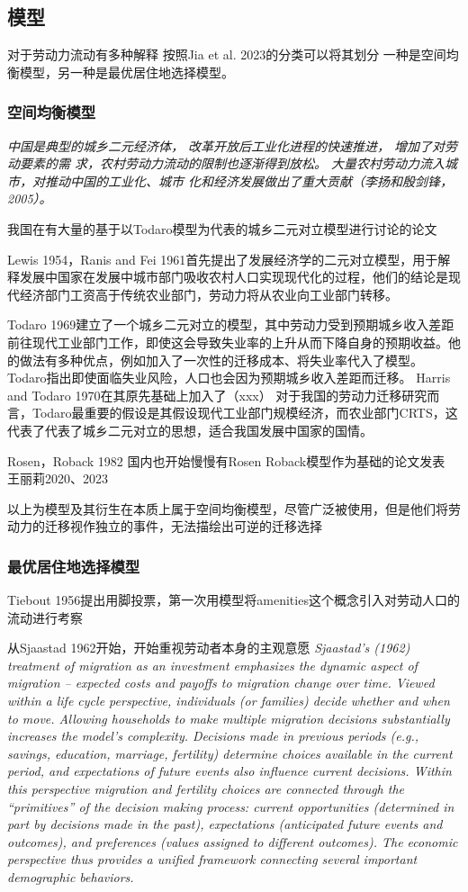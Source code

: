 \documentclass{article}
\numberwithin{equation}{section} %
\begin{document}
\subsection{模型}
对于劳动力流动有多种解释
按照Jia et al. 2023的分类可以将其划分
一种是空间均衡模型，另一种是最优居住地选择模型。

\subsubsection{空间均衡模型}
\textit{中国是典型的城乡二元经济体， 改革开放后工业化进程的快速推进， 增加了对劳动要素的需 求，农村劳动力流动的限制也逐渐得到放松。 大量农村劳动力流入城市，对推动中国的工业化、城市 化和经济发展做出了重大贡献（李扬和殷剑锋，2005）。}

我国在有大量的基于以Todaro模型为代表的城乡二元对立模型进行讨论的论文

Lewis 1954，Ranis and Fei 1961首先提出了发展经济学的二元对立模型，用于解释发展中国家在发展中城市部门吸收农村人口实现现代化的过程，他们的结论是现代经济部门工资高于传统农业部门，劳动力将从农业向工业部门转移。

Todaro 1969建立了一个城乡二元对立的模型，其中劳动力受到预期城乡收入差距前往现代工业部门工作，即使这会导致失业率的上升从而下降自身的预期收益。他的做法有多种优点，例如加入了一次性的迁移成本、将失业率代入了模型。Todaro指出即使面临失业风险，人口也会因为预期城乡收入差距而迁移。
Harris and Todaro 1970在其原先基础上加入了（xxx）
对于我国的劳动力迁移研究而言，Todaro最重要的假设是其假设现代工业部门规模经济，而农业部门CRTS，这代表了代表了城乡二元对立的思想，适合我国发展中国家的国情。


Rosen，Roback 1982
国内也开始慢慢有Rosen Roback模型作为基础的论文发表
王丽莉2020、2023

以上为模型及其衍生在本质上属于空间均衡模型，尽管广泛被使用，但是他们将劳动力的迁移视作独立的事件，无法描绘出可逆的迁移选择

\subsubsection{最优居住地选择模型}
Tiebout 1956提出用脚投票，第一次用模型将amenities这个概念引入对劳动人口的流动进行考察

从Sjaastad 1962开始，开始重视劳动者本身的主观意愿
\textit{Sjaastad’s (1962) treatment of migration as an investment emphasizes the dynamic  aspect of migration – expected costs and payoffs to migration change over time. Viewed  within a life cycle perspective, individuals (or families) decide whether and when to  move. Allowing households to make multiple migration decisions substantially increases the model’s complexity. Decisions made in previous periods (e.g., savings, education,  marriage, fertility) determine choices available in the current period, and expectations  of future events also influence current decisions. Within this perspective migration and  fertility choices are connected through the “primitives” of the decision making process:  current opportunities (determined in part by decisions made in the past), expectations  (anticipated future events and outcomes), and preferences (values assigned to different  outcomes). The economic perspective thus provides a unified framework connecting several important demographic behaviors.}
\end{document}

